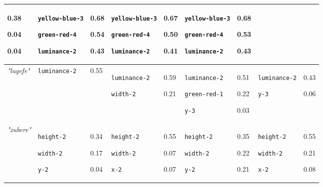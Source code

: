 {\begin{tabular}{@{}p{0.95cm}|p{1.9cm}@{}p{0.6cm}@{}|p{1.9cm}@{}p{0.6cm}@{}|p{1.9cm}@{}p{0.6cm}@{}|p{1.9cm}@{}p{0.5cm}@{}}
0.38

0.04

0.04 & \texttt{yellow-blue-3}

\texttt{green-red-4}

\texttt{luminance-2} & 0.68

0.54

0.43 & \texttt{yellow-blue-3}

\texttt{green-red-4}

\texttt{luminance-2} & 0.67

0.50

0.41 & \texttt{yellow-blue-3}

\texttt{green-red-4}

\texttt{luminance-2} & 0.68

0.53

0.43\\
\hline
\textit{"lugefe"} & \texttt{luminance-2} & 0.55 & \texttt{luminance-2}

\texttt{width-2} & 0.59

0.21 & \texttt{luminance-2}

\texttt{green-red-1}

\texttt{y-3} & 0.51

0.22

0.03 & \texttt{luminance-2}

\texttt{y-3} & 0.43

0.06\\
\hline
\textit{"zubere"} & \texttt{height-2}

\texttt{width-2}

\texttt{y-2} & 0.34

0.17

0.04 & \texttt{height-2}

\texttt{width-2}

\texttt{x-2} & 0.55

0.07

0.07 & \texttt{height-2}

\texttt{width-2}

\texttt{y-2} & 0.35

0.22

0.21 & \texttt{height-2}

\texttt{width-2}

\texttt{x-2} & 0.55

0.21

0.08
\end{tabular}}

